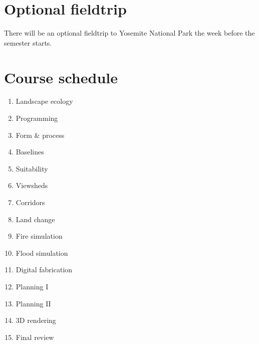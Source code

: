 \documentclass[11pt,article,oneside]{memoir}
\begin{document}
\section{Optional fieldtrip}
There will be an optional fieldtrip to Yosemite National Park
the week before the semester starts. 



\section{Course schedule}
\small
%
\begin{multicols}{3}
\begin{enumerate}[label=\textbf{\arabic*}]
%
\item Landscape ecology
\item Programming
\item Form \& process
\item Baselines
\item Suitability
\item Viewsheds
\item Corridors
\item Land change
\item Fire simulation
\item Flood simulation
\item Digital fabrication
\item Planning I
\item Planning II
\item 3D rendering
\item Final review
%
\end{enumerate}
\end{multicols}

\clearpage


\end{document}
